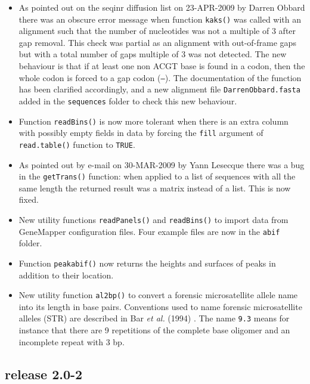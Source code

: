 \documentclass{article}
\begin{document}
\begin{itemize}

\item As pointed out on the seqinr diffusion list on 23-APR-2009
by Darren Obbard there was an obscure error message when function
\texttt{kaks()} was called with an alignment such that the number
of nucleotides was not a multiple of 3 after gap removal. This check
was partial as an alignment with out-of-frame gaps but with
a total number of gaps multiple of 3 was not detected.
The new behaviour is that if at least one non ACGT base is found in a
codon, then the whole codon is forced to a gap codon (\texttt{---}).
The documentation of the function has been clarified accordingly,
and a new alignment file \texttt{DarrenObbard.fasta} added in
the \texttt{sequences} folder to check this new behaviour.

\item Function \texttt{readBins()} is now more tolerant when there
is an extra column with possibly empty fields in data by forcing
the \texttt{fill} argument of \texttt{read.table()} function to
\texttt{TRUE}.

\item As pointed out by e-mail on 30-MAR-2009 by Yann Lesecque there 
was a bug in the \texttt{getTrans()} function: when applied to a 
list of sequences with all the same length the returned result 
was a matrix instead of a list. This is now fixed.

\item New utility functions \texttt{readPanels()} and \texttt{readBins()} 
to import data from GeneMapper configuration files. Four example files
are now in the \texttt{abif} folder.

\item Function \texttt{peakabif()} now returns the heights and
surfaces of peaks in addition to their location.

\item New utility function \texttt{al2bp()} to convert
a forensic microsatellite allele name into its length in base pairs.
Conventions used to name forensic microsatellite alleles (STR) are described
in Bar \emph{et al.} (1994) \cite{BarW1994}. 
The name \texttt{9.3} means for instance that there are
9 repetitions of the complete base oligomer and an incomplete 
repeat with 3 bp.

\end{itemize}

\subsection*{release 2.0-2}
\end{document}
